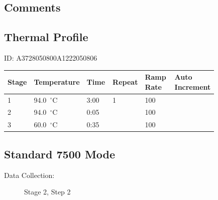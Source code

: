 \documentclass[UTF8,10pt,a4paper,fontset=fandol]{ctexart}
\newcommand{\fieldvalue}[1]{#1}
\begin{document}
\subsection{Comments}

\subsection{Thermal Profile}

\noindent
ID:
\fieldvalue{A3728050800A1222050806}

\medskip

\small
\begin{tabular}{|p{0.08\linewidth}|p{0.16\linewidth}|p{0.13\linewidth}|p{0.12\linewidth}|p{0.16\linewidth}|p{0.18\linewidth}|}
\hline
\textbf{Stage} & \textbf{Temperature} & \textbf{Time} & \textbf{Repeat} &
\textbf{Ramp Rate} & \textbf{Auto Increment} \\
\hline
\fieldvalue{1} &
\fieldvalue{94.0~$^\circ$C} &
\fieldvalue{3:00} &
\fieldvalue{1} &
\fieldvalue{100} &
\\
\hline
\fieldvalue{2} &
\fieldvalue{94.0~$^\circ$C} &
\fieldvalue{0:05} &
&
\fieldvalue{100} &
\\
\hline
\fieldvalue{3} &
\fieldvalue{60.0~$^\circ$C} &
\fieldvalue{0:35} &
&
\fieldvalue{100} &
\\
\hline
\end{tabular}
\normalsize

\subsection{Standard 7500 Mode}

\begin{description}
  \item[Data Collection:]
  \fieldvalue{Stage 2, Step 2}
\end{description}
\end{document}
